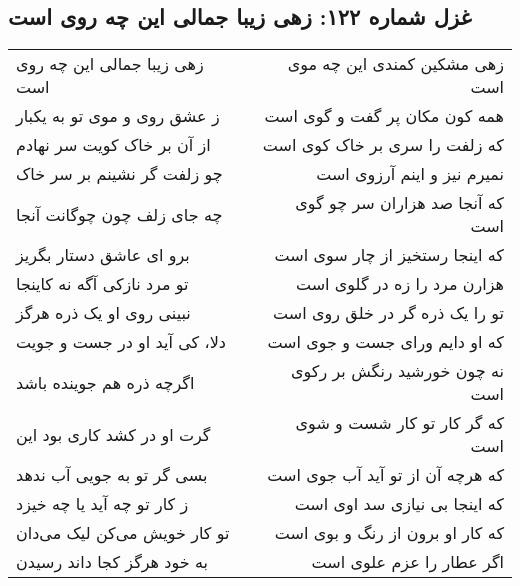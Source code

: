 \begin{center}
\section*{غزل شماره ۱۲۲: زهی زیبا جمالی این چه روی است}
\label{sec:122}
\begin{longtable}{l p{0.5cm} r}
زهی زیبا جمالی این چه روی است
&&
زهی مشکین کمندی این چه موی است
\\
ز عشق روی و موی تو به یکبار
&&
همه کون مکان پر گفت و گوی است
\\
از آن بر خاک کویت سر نهادم
&&
که زلفت را سری بر خاک کوی است
\\
چو زلفت گر نشینم بر سر خاک
&&
نمیرم نیز و اینم آرزوی است
\\
چه جای زلف چون چوگانت آنجا
&&
که آنجا صد هزاران سر چو گوی است
\\
برو ای عاشق دستار بگریز
&&
که اینجا رستخیز از چار سوی است
\\
تو مرد نازکی آگه نه کاینجا
&&
هزارن مرد را زه در گلوی است
\\
نبینی روی او یک ذره هرگز
&&
تو را یک ذره گر در خلق روی است
\\
دلا، کی آید او در جست و جویت
&&
که او دایم ورای جست و جوی است
\\
اگرچه ذره هم جوینده باشد
&&
نه چون خورشید رنگش بر رکوی است
\\
گرت او در کشد کاری بود این
&&
که گر کار تو کار شست و شوی است
\\
بسی گر تو به جویی آب ندهد
&&
که هرچه آن از تو آید آب جوی است
\\
ز کار تو چه آید یا چه خیزد
&&
که اینجا بی نیازی سد اوی است
\\
تو کار خویش می‌کن لیک می‌دان
&&
که کار او برون از رنگ و بوی است
\\
به خود هرگز کجا داند رسیدن
&&
اگر عطار را عزم علوی است
\\
\end{longtable}
\end{center}
